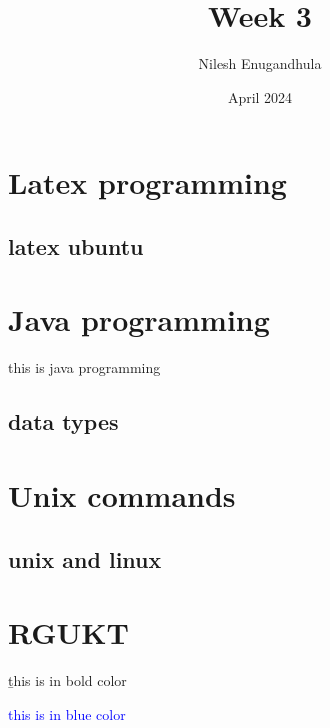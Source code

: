 \documentclass{article}
\title{Week 3}
\author{Nilesh Enugandhula}
\date{April 2024}
\begin{document}
	
	\maketitle
	
	\tableofcontents
	\newpage
	
	\section{Latex programming} \label{sec:intro}
	\subsection{latex ubuntu}
	
	\section{Java programming} \label{sec:java}
	this is java programming
	\subsection{data types}
	
	\section{Unix commands} \label{sec:intro}
	\subsection{unix and linux}
	
	
	\section{RGUKT}
	\b{this is in bold color}
	
	\textcolor{blue}{this is in blue color}
	
	
\end{document}
